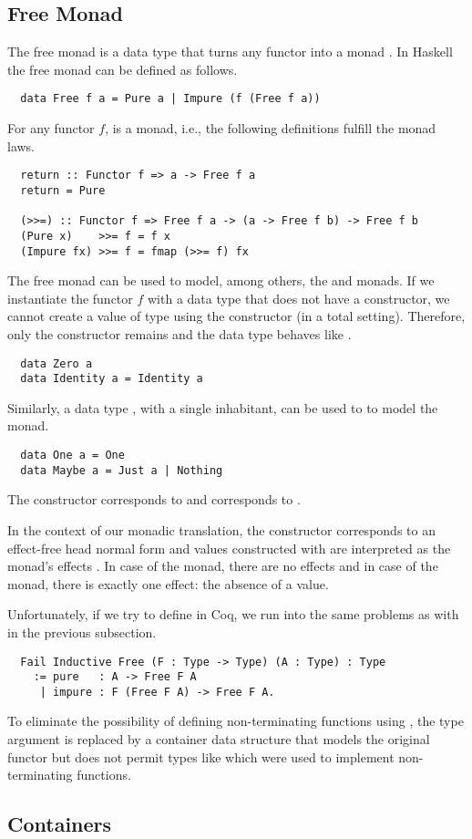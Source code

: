 \subsection{Free Monad}
\label{sec:preliminaries:modeling-effects:free}
The free monad is a data type that turns any functor into a monad \cite[p.~7]{Dylus:2018}.
In Haskell the free monad can be defined as follows.
\begin{verbatim}
  data Free f a = Pure a | Impure (f (Free f a))
\end{verbatim}
For any functor $f$,  is a monad, i.e., the following definitions fulfill the monad laws.
\begin{verbatim}
  return :: Functor f => a -> Free f a
  return = Pure

  (>>=) :: Functor f => Free f a -> (a -> Free f b) -> Free f b
  (Pure x)    >>= f = f x
  (Impure fx) >>= f = fmap (>>= f) fx
\end{verbatim}
The free monad can be used to model, among others, the  and  monads.
If we instantiate the functor $f$ with a data type  that does not have a constructor, we cannot create a value of type  using the  constructor (in a total setting).
Therefore, only the  constructor remains and the data type behaves like .
\begin{verbatim}
  data Zero a
  data Identity a = Identity a
\end{verbatim}
Similarly, a data type , with a single inhabitant, can be used to to model the  monad.
\begin{verbatim}
  data One a = One
  data Maybe a = Just a | Nothing
\end{verbatim}
The  constructor corresponds to  and  corresponds to .

In the context of our monadic translation, the  constructor corresponds to an effect-free head normal form and values constructed with  are interpreted as the monad's effects \cite[p.~127]{Christiansen:2019}.
In case of the  monad, there are no effects and in case of the  monad, there is exactly one effect: the absence of a value.

Unfortunately, if we try to define  in Coq, we run into the same problems as with  in the previous subsection.
\begin{verbatim}
  Fail Inductive Free (F : Type -> Type) (A : Type) : Type
    := pure   : A -> Free F A
     | impure : F (Free F A) -> Free F A.
\end{verbatim}
To eliminate the possibility of defining non-terminating functions using , the type argument  is replaced by a container data structure that models the original functor but does not permit types like  which were used to implement non-terminating functions.

\subsection{Containers}
\label{sec:preliminaries:modeling-effects:containers}
